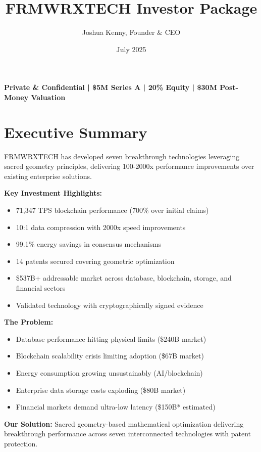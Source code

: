 \documentclass{article}
\title{FRMWRXTECH Investor Package}
\author{Joshua Kenny, Founder \& CEO}
\date{July 2025}
\begin{document}
\maketitle
\begin{center}
    \textbf{Private \& Confidential | \$5M Series A | 20\% Equity | \$30M Post-Money Valuation}
\end{center}

\tableofcontents
\newpage

\section{Executive Summary}
FRMWRXTECH has developed seven breakthrough technologies leveraging sacred geometry principles, delivering 100-2000x performance improvements over existing enterprise solutions.

\textbf{Key Investment Highlights:}
\begin{itemize}
    \item 71,347 TPS blockchain performance (700\% over initial claims)
    \item 10:1 data compression with 2000x speed improvements
    \item 99.1\% energy savings in consensus mechanisms
    \item 14 patents secured covering geometric optimization
    \item \$537B+ addressable market across database, blockchain, storage, and financial sectors
    \item Validated technology with cryptographically signed evidence
\end{itemize}

\textbf{The Problem:}
\begin{itemize}
    \item Database performance hitting physical limits (\$240B market)
    \item Blockchain scalability crisis limiting adoption (\$67B market)
    \item Energy consumption growing unsustainably (AI/blockchain)
    \item Enterprise data storage costs exploding (\$80B market)
    \item Financial markets demand ultra-low latency (\$150B* estimated)
\end{itemize}

\textbf{Our Solution:} Sacred geometry-based mathematical optimization delivering breakthrough performance across seven interconnected technologies with patent protection.
\end{document}
